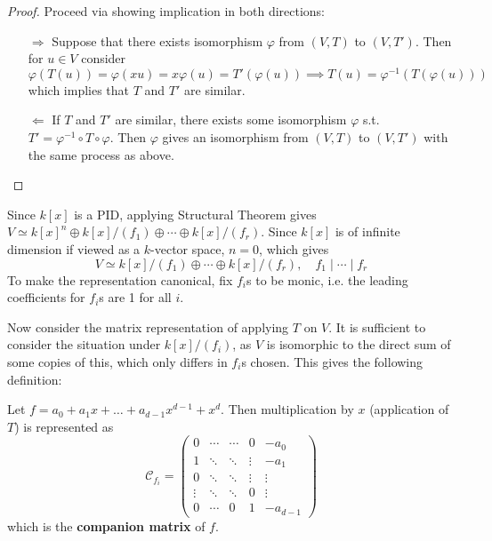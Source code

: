 \begin{proof}
    Proceed via showing implication in both directions:
    \begin{itemize}
        \item[$\Rightarrow$] Suppose that there exists isomorphism $\varphi$ from $(V, T)$ to $(V, T')$. Then for $u\in V$ consider
        \[
            \varphi(T(u)) = \varphi(xu) = x \varphi(u) = T'(\varphi(u)) \implies T(u) = \varphi^{-1}(T(\varphi(u)))
        \]
        which implies that $T$ and $T'$ are similar.
        \item[$\Leftarrow$] If $T$ and $T'$ are similar, there exists some isomorphism $\varphi$ s.t. $T' = \varphi^{-1}\circ T\circ\varphi$. Then $\varphi$ gives an isomorphism from $(V, T)$ to $(V, T')$ with the same process as above.
    \end{itemize}
\end{proof}

Since $k[x]$ is a PID, applying Structural Theorem gives $V \simeq k[x]^n \oplus k[x]/(f_1) \oplus \cdots \oplus k[x]/(f_r)$. Since $k[x]$ is of infinite dimension if viewed as a $k$-vector space, $n = 0$, which gives 
\begin{equation}\tag{$\ast$}\label{eq:(V, T) structure}
    V \simeq k[x]/(f_1) \oplus \cdots \oplus k[x]/(f_r), \quad f_1 \mid \cdots \mid f_r
\end{equation}
To make the representation canonical, fix $f_i$s to be monic, i.e. the leading coefficients for $f_i$s are 1 for all $i$. 

Now consider the matrix representation of applying $T$ on $V$. It is sufficient to consider the situation under $k[x]/(f_i)$, as $V$ is isomorphic to the direct sum of some copies of this, which only differs in $f_i$s chosen. This gives the following definition:

\begin{definition}
    Let $f = a_0 + a_1 x + \ldots + a_{d-1}x^{d-1} + x^d$. Then multiplication by $x$ (application of $T$) is represented as
    \[
        \mathcal{C}_{f_i} = \begin{pmatrix}
            0       & \cdots  & \cdots  & 0      & -a_0   \\
            1       & \ddots  & \ddots  & \vdots & -a_1   \\
            0       & \ddots  & \ddots  & \vdots & \vdots \\
            \vdots  & \ddots  & \ddots  & 0      & \vdots \\
            0       & \cdots  & 0       & 1      & -a_{d-1}
        \end{pmatrix}
    \]
    which is the \textbf{companion matrix} of $f$. 
\end{definition}

